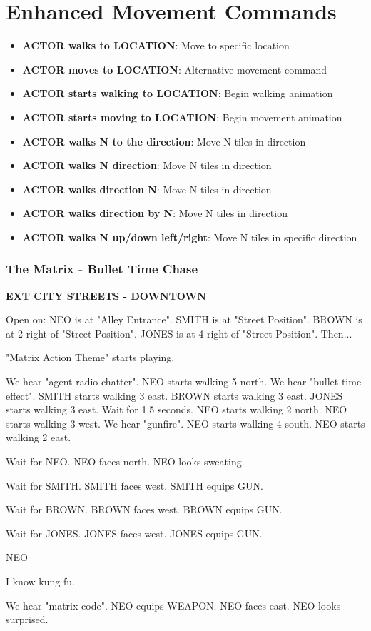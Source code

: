 \documentclass[11pt,letterpaper,oldstylefigures]{memoir}
\newcommand{\slugline}[1]{\nobreak\textbf{\MakeUppercase{#1}}\par\nobreak\vspace{1\baselineskip}}
\newcommand{\speaker}[1]{\nobreak\hspace*{0.333\textwidth}\MakeUppercase{#1}\par\nobreak\vspace{0.5\baselineskip}}
\newcommand{\dialogue}[1]{\nobreak\hspace*{0.25\textwidth}\begin{minipage}{0.5\textwidth}#1\end{minipage}\par\vspace{1\baselineskip}}
\newcommand{\stagedir}[1]{#1\par\vspace{1\baselineskip}}
\newenvironment{FountainExample}
  {\begingroup
  \ttfamily\small
   \setlength{\parindent}{0pt}
  \setlength{\parskip}{0.5em}
  \allowdisplaybreaks
  \setlength{\displaywidowpenalty}{0}
  \setlength{\widowpenalty}{0}
  \setlength{\clubpenalty}{0}
  \setlength{\interlinepenalty}{0}
}
  {\endgroup}
\newcommand{\fountain}[1]{\textbf{#1}}
\begin{document}
\section{Enhanced Movement Commands}
\begin{itemize}
\item \fountain{ACTOR walks to LOCATION}: Move to specific location
\item \fountain{ACTOR moves to LOCATION}: Alternative movement command
\item \fountain{ACTOR starts walking to LOCATION}: Begin walking animation
\item \fountain{ACTOR starts moving to LOCATION}: Begin movement animation
\item \fountain{ACTOR walks N to the direction}: Move N tiles in direction
\item \fountain{ACTOR walks N direction}: Move N tiles in direction
\item \fountain{ACTOR walks direction N}: Move N tiles in direction
\item \fountain{ACTOR walks direction by N}: Move N tiles in direction
\item \fountain{ACTOR walks N up/down left/right}: Move N tiles in specific direction
\end{itemize}

\subsubsection*{The Matrix - Bullet Time Chase}
\label{ex:the-matrix-bullet-time-chase}

\begin{FountainExample}
\slugline{EXT CITY STREETS - DOWNTOWN}

\stagedir{Open on: NEO is at "Alley Entrance". SMITH is at "Street Position". BROWN is at 2 right of "Street Position". JONES is at 4 right of "Street Position". Then...}
\stagedir{"Matrix Action Theme" starts playing.}

\stagedir{We hear "agent radio chatter". NEO starts walking 5 north. We hear "bullet time effect". SMITH starts walking 3 east. BROWN starts walking 3 east. JONES starts walking 3 east. Wait for 1.5 seconds. NEO starts walking 2 north. NEO starts walking 3 west. We hear "gunfire". NEO starts walking 4 south. NEO starts walking 2 east.}
\stagedir{Wait for NEO. NEO faces north. NEO looks sweating.}
\stagedir{Wait for SMITH. SMITH faces west. SMITH equips GUN.}
\stagedir{Wait for BROWN. BROWN faces west. BROWN equips GUN.}
\stagedir{Wait for JONES. JONES faces west. JONES equips GUN.}

\speaker{NEO}
\dialogue{I know kung fu.}

\stagedir{We hear "matrix code". NEO equips WEAPON. NEO faces east. NEO looks surprised.}
\end{FountainExample}
\end{document}
